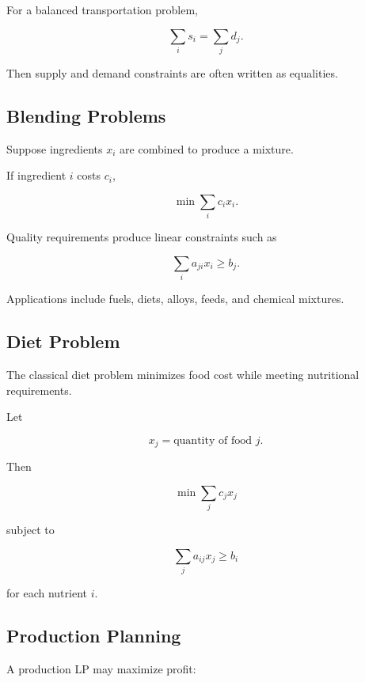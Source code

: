 For a balanced transportation problem,

\[
\boxed{
\sum_i s_i
=
\sum_j d_j.
}
\]

Then supply and demand constraints are often written as equalities.

\subsection{Blending Problems}
\label{subsec:blending-problems}

Suppose ingredients \(x_i\) are combined to produce a mixture.

If ingredient \(i\) costs \(c_i\),

\[
\boxed{
\min
\sum_i
c_ix_i.
}
\]

Quality requirements produce linear constraints such as

\[
\boxed{
\sum_i
a_{ji}x_i
\geq
b_j.
}
\]

Applications include fuels, diets, alloys, feeds, and chemical mixtures.

\subsection{Diet Problem}
\label{subsec:diet-problem}

The classical diet problem minimizes food cost while meeting nutritional
requirements.

Let

\[
x_j
=
\text{quantity of food }j.
\]

Then

\[
\boxed{
\min
\sum_j
c_jx_j
}
\]

subject to

\[
\boxed{
\sum_j
a_{ij}x_j
\geq
b_i
}
\]

for each nutrient \(i\).

\subsection{Production Planning}
\label{subsec:lp-production-planning}

A production LP may maximize profit:

